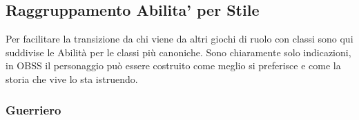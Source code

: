 \pagebreak

\subsection{Raggruppamento Abilita' per Stile}

Per facilitare la transizione da chi viene da altri giochi di ruolo con classi sono qui suddivise le Abilità per le classi più canoniche. Sono chiaramente solo indicazioni, in OBSS il personaggio può essere costruito come meglio si preferisce e come la storia che vive lo sta istruendo.

\begin{multicols}{3}

{\small

\begin{flushleft}

\titlespacing*{\subsubsection}{0pt}{0.5em}{0.5em}\subsubsection*{Guerriero}


\end{flushleft}}
\end{multicols}
